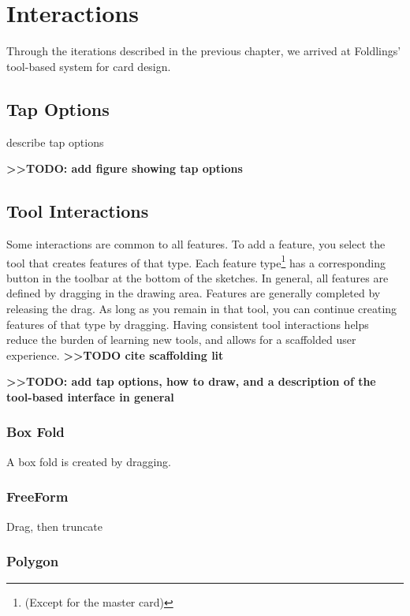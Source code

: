 \section{Interactions}\label{interactions}

Through the iterations described in the previous chapter, we arrived at
Foldlings' tool-based system for card design.

\subsection{Tap Options}\label{tap-options}

describe tap options

\textbf{\textgreater{}\textgreater{}TODO: add figure showing tap
options}

\subsection{Tool Interactions}\label{tool-interactions}

Some interactions are common to all features. To add a feature, you
select the tool that creates features of that type. Each feature
type\footnote{(Except for the master card)} has a corresponding button
in the toolbar at the bottom of the sketches. In general, all features
are defined by dragging in the drawing area. Features are generally
completed by releasing the drag. As long as you remain in that tool, you
can continue creating features of that type by dragging. Having
consistent tool interactions helps reduce the burden of learning new
tools, and allows for a scaffolded user experience.
\textbf{\textgreater{}\textgreater{}TODO cite scaffolding lit}

\textbf{\textgreater{}\textgreater{}TODO: add tap options, how to draw,
and a description of the tool-based interface in general}

\subsubsection{Box Fold}\label{box-fold}

A box fold is created by dragging.

\subsubsection{FreeForm}\label{freeform}

Drag, then truncate

\subsubsection{Polygon}\label{polygon}

